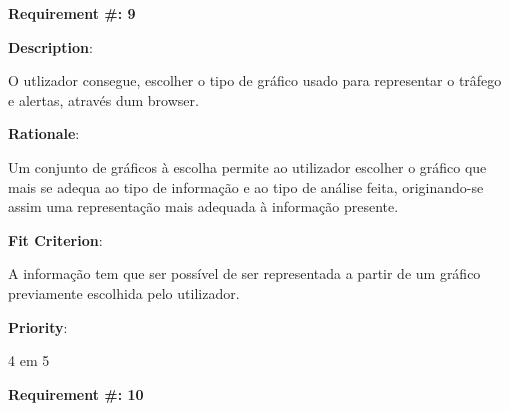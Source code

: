 \pagebreak






\begin{minipage}{0.55\textwidth}
\begin{flushleft}\textbf{Requirement \#: 9}\end{flushleft}
\end{minipage}
\begin{minipage}{0.4\textwidth}
\end{minipage}

\begin{description}
\item \textbf{Description}:

O utlizador consegue, escolher o tipo de gráfico usado para representar o trâfego e alertas, através dum browser.

\item \textbf{Rationale}:

Um conjunto de gráficos à escolha permite ao utilizador escolher o gráfico que mais se adequa ao tipo de informação e ao tipo de análise feita,
originando-se assim uma representação mais adequada à informação presente.


\item \textbf{Fit Criterion}:

A informação tem que ser possível de ser representada a partir de um gráfico previamente escolhida pelo utilizador.

\item \textbf{Priority}:

4 em 5

\end{description}

\pagebreak






\begin{minipage}{0.55\textwidth}
\begin{flushleft}\textbf{Requirement \#: 10}\end{flushleft}
\end{minipage}
\begin{minipage}{0.4\textwidth}
\end{minipage}

